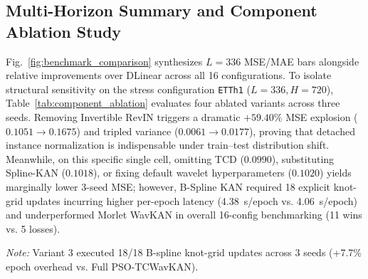 \documentclass[pdflatex,sn-mathphys-num,referee,lineno]{sn-jnl}
\theoremstyle{thmstyleone}
\theoremstyle{thmstyletwo}
\theoremstyle{thmstylethree}
\begin{document}
\subsection{Multi-Horizon Summary and Component Ablation Study}\label{subsec:ablation}
Fig.~\ref{fig:benchmark_comparison} synthesizes $L=336$ MSE/MAE bars alongside relative improvements over DLinear across all 16 configurations. To isolate structural sensitivity on the stress configuration \texttt{ETTh1} ($L=336, H=720$), Table~\ref{tab:component_ablation} evaluates four ablated variants across three seeds. Removing Invertible RevIN triggers a dramatic $+59.40\%$ MSE explosion ($0.1051 \to 0.1675$) and tripled variance ($0.0061 \to 0.0177$), proving that detached instance normalization is indispensable under train--test distribution shift. Meanwhile, on this specific single cell, omitting TCD ($0.0990$), substituting Spline-KAN ($0.1018$), or fixing default wavelet hyperparameters ($0.1020$) yields marginally lower 3-seed MSE; however, B-Spline KAN required 18 explicit knot-grid updates incurring higher per-epoch latency (4.38~s/epoch vs. 4.06~s/epoch) and underperformed Morlet WavKAN in overall 16-config benchmarking (11 wins vs. 5 losses).

\begin{table}[htbp]
\centering
\caption{Three-seed component ablation study on \texttt{ETTh1} ($L=336, H=720$, $B=32$).}
\label{tab:component_ablation}
\vspace{4pt}
\footnotesize{\textit{Note:} Variant 3 executed 18/18 B-spline knot-grid updates across 3 seeds (+7.7\% epoch overhead vs. Full PSO-TCWavKAN).}
\end{table}
\end{document}
